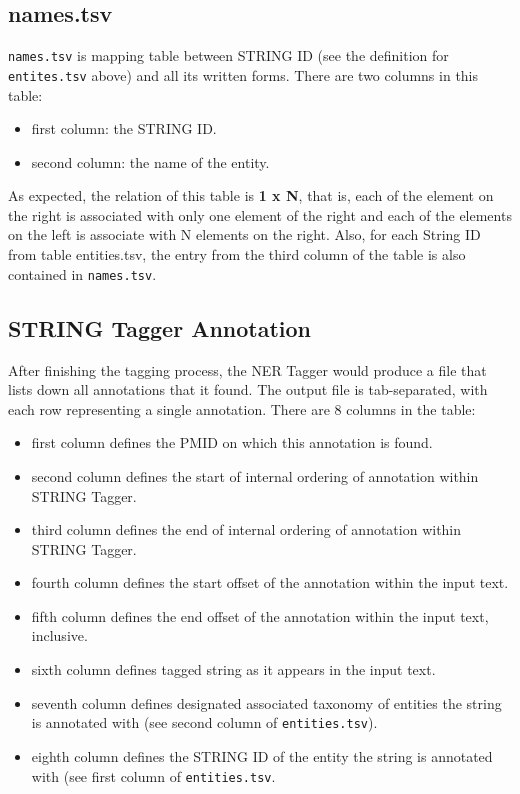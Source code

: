 \subsection{names.tsv}

\texttt{names.tsv} is mapping table between STRING ID (see the definition for \texttt{entites.tsv} above) and all its written forms. There are two columns in this table:

\begin{itemize}
\item first column: the STRING ID.
\item second column: the name of the entity.
\end{itemize}

As expected, the relation of this table is \textbf{1 x N}, that is, each of the element on the right is associated with only one element of the right and each of the elements on the left is associate with N elements on the right. Also, for each String ID from table entities.tsv, the entry from the third column of the table is also contained in \texttt{names.tsv}.

\subsection{STRING Tagger Annotation}

After finishing the tagging process, the NER Tagger would produce a file that lists down all annotations that it found. The output file is tab-separated, with each row representing a single annotation. There are 8 columns in the table:

\begin{itemize}
\item first column defines the PMID on which this annotation is found.
\item second column defines the start of internal ordering of annotation within STRING Tagger.
\item third column defines the end of internal ordering of annotation within STRING Tagger.
\item fourth column defines the start offset of the annotation within the input text.
\item fifth column defines the end offset of the annotation within the input text, inclusive.
\item sixth column defines tagged string as it appears in the input text.
\item seventh column defines designated associated taxonomy of entities the string is annotated with (see second column of \texttt{entities.tsv}).
\item eighth column defines the STRING ID of the entity the string is annotated with (see first column of \texttt{entities.tsv}.
\end{itemize}

